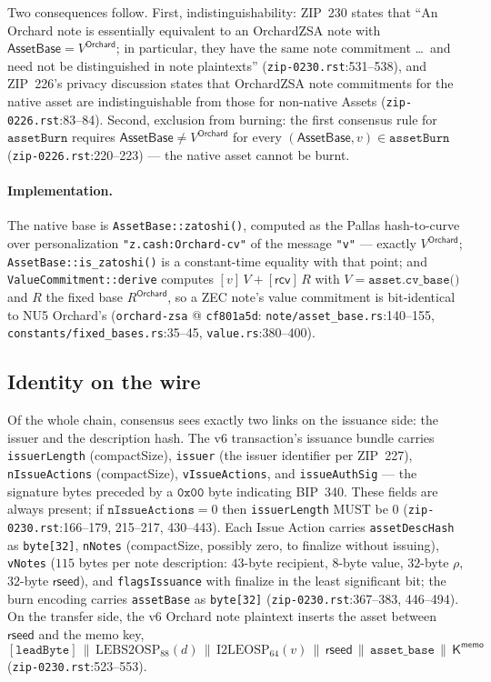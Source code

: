\documentclass[11pt,a4paper]{article}
\theoremstyle{definition}
\newcommand{\rcv}{\ensuremath{\mathsf{rcv}}}
\begin{document}
Two consequences follow. First, indistinguishability: ZIP~230 states that
``An Orchard note is essentially equivalent to an OrchardZSA note with
$\mathsf{AssetBase} = V^{\mathsf{Orchard}}$; in particular, they have the
same note commitment \dots\ and need not be distinguished in note
plaintexts'' (\texttt{zip-0230.rst}:531--538), and ZIP~226's privacy
discussion states that OrchardZSA note commitments for the native asset
are indistinguishable from those for non-native Assets
(\texttt{zip-0226.rst}:83--84). Second, exclusion from burning: the first
consensus rule for $\mathtt{assetBurn}$ requires
$\mathsf{AssetBase} \neq V^{\mathsf{Orchard}}$ for every
$(\mathsf{AssetBase}, v) \in \mathtt{assetBurn}$
(\texttt{zip-0226.rst}:220--223) --- the native asset cannot be burnt.

\paragraph{Implementation.} The native base is
\texttt{AssetBase::zatoshi()}, computed as the Pallas hash-to-curve over
personalization \texttt{"z.cash:Orchard-cv"} of the message \texttt{"v"}
--- exactly $V^{\mathsf{Orchard}}$; \texttt{AssetBase::is\_zatoshi()} is a
constant-time equality with that point; and
\texttt{ValueCommitment::derive} computes $[v]\,V + [\rcv]\,R$ with
$V = \texttt{asset.cv\_base()}$ and $R$ the fixed base
$R^{\mathsf{Orchard}}$, so a ZEC note's value commitment is bit-identical
to NU5 Orchard's (\texttt{orchard-zsa} @ \texttt{cf801a5d}:
\texttt{note/asset\_base.rs}:140--155,
\texttt{constants/fixed\_bases.rs}:35--45,
\texttt{value.rs}:380--400).

\subsection{Identity on the wire}\label{sec:zsa-identity-wire}

Of the whole chain, consensus sees exactly two links on the issuance side:
the issuer and the description hash. The v6 transaction's issuance bundle
carries \texttt{issuerLength} (compactSize), \texttt{issuer} (the issuer
identifier per ZIP~227), \texttt{nIssueActions} (compactSize),
\texttt{vIssueActions}, and \texttt{issueAuthSig} --- the signature bytes
preceded by a $\mathtt{0x00}$ byte indicating BIP~340. These fields are
always present; if $\texttt{nIssueActions} = 0$ then \texttt{issuerLength}
MUST be $0$ (\texttt{zip-0230.rst}:166--179, 215--217, 430--443). Each
Issue Action carries \texttt{assetDescHash} as \texttt{byte[32]},
\texttt{nNotes} (compactSize, possibly zero, to finalize without
issuing), \texttt{vNotes} ($115$ bytes per note description: $43$-byte
recipient, $8$-byte value, $32$-byte $\rho$, $32$-byte
$\mathsf{rseed}$), and \texttt{flagsIssuance} with finalize in the least
significant bit; the burn encoding carries \texttt{assetBase} as
\texttt{byte[32]} (\texttt{zip-0230.rst}:367--383, 446--494). On the
transfer side, the v6 Orchard note plaintext inserts the asset between
$\mathsf{rseed}$ and the memo key,
\[
[\mathtt{leadByte}] \,\|\, \mathrm{LEBS2OSP}_{88}(d) \,\|\,
\mathrm{I2LEOSP}_{64}(v) \,\|\, \mathsf{rseed} \,\|\,
\texttt{asset\_base} \,\|\, \mathsf{K}^{\mathsf{memo}}
\]
(\texttt{zip-0230.rst}:523--553).
\end{document}
